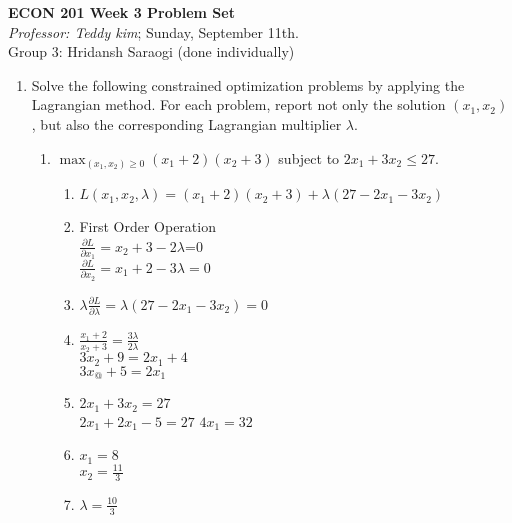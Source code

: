 \documentclass[11pt]{article}
\begin{document}
\begin{center}
\textbf{ECON 201 Week 3 Problem Set}\\
\textit {Professor: Teddy kim};  
Sunday, September 11th.
\\Group 3: Hridansh Saraogi (done individually)
\end{center}

\begin{enumerate}
\item Solve the following constrained optimization problems by applying the Lagrangian method. For each problem, report not only the solution $(x_{1},x_{2})$, but also the corresponding Lagrangian multiplier $\lambda$.
    \begin{enumerate}
        \item $\max_{(x_{1},x_{2})\geq 0}(x_{1}+2)(x_{2}+3)$ subject to $2x_{1}+3x_{2}\leq 27$.
        \begin{enumerate}
                \item $L(x_1, x_2, \lambda) = (x_1 + 2) (x_2 + 3) + \lambda(27 - 2x_1 - 3x_2)$
                \item First Order Operation\\
                $\frac{\partial L}{\partial x_1} = x_2 + 3 -2\lambda$=0\\
                $\frac{\partial L}{\partial x_2} = x_1 + 2 -3\lambda=0$
                \item $\lambda \frac{\partial L}{\partial \lambda} = \lambda (27 -2x_1 -3x_2) = 0$
                \item $\frac{x_1 + 2}{x_2 + 3} = \frac{3\lambda}{2\lambda}$\\
                $3x_2 + 9 = 2x_1 + 4$\\
                $3x_@ + 5 = 2x_1$\\
                \item $2x_1 +3x_2 = 27$\\
                $2x_1 +2x_1 - 5 = 27$
                $4x_1 = 32$
                \item $x_1 = 8$\\
                $x_2 = \frac{11}{3}$
                \item $\lambda = \frac{10}{3}$
        \end{enumerate}


\end{enumerate}
\end{enumerate}
\end{document}
